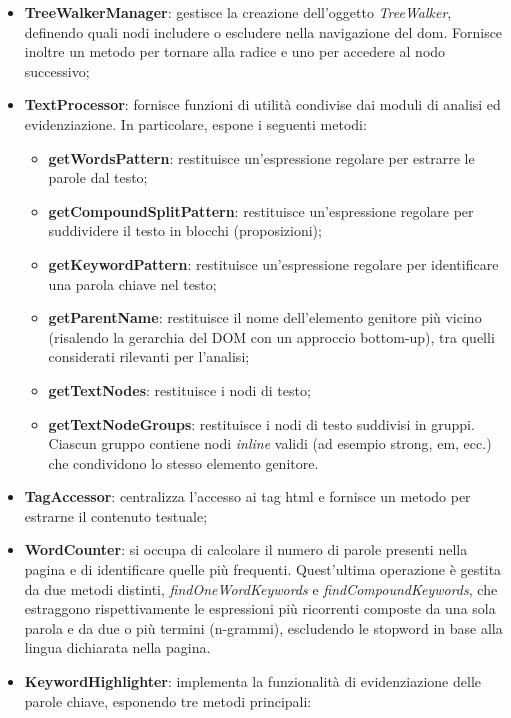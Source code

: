 \begin{itemize}
  \item \textbf{TreeWalkerManager}: gestisce la creazione dell’oggetto \textit{TreeWalker}, definendo quali nodi includere o escludere nella navigazione del \gls{dom}. Fornisce inoltre un metodo per tornare alla radice e uno per accedere al nodo successivo;
  \item \textbf{TextProcessor}: fornisce funzioni di utilità condivise dai moduli di analisi ed evidenziazione. In particolare, espone i seguenti metodi:
  \begin{itemize}
    \item \textbf{getWordsPattern}: restituisce un'espressione regolare per estrarre le parole dal testo;
    \item \textbf{getCompoundSplitPattern}: restituisce un’espressione regolare per suddividere il testo in blocchi (proposizioni);
    \item \textbf{getKeywordPattern}: restituisce un’espressione regolare per identificare una parola chiave nel testo;
    \item \textbf{getParentName}: restituisce il nome dell’elemento genitore più vicino (risalendo la gerarchia del DOM con un approccio bottom-up), tra quelli considerati rilevanti per l’analisi;
    \item \textbf{getTextNodes}: restituisce i nodi di testo;
    \item \textbf{getTextNodeGroups}: restituisce i nodi di testo suddivisi in gruppi. Ciascun gruppo contiene nodi \textit{inline} validi (ad esempio strong, em, ecc.) che condividono lo stesso elemento genitore.
  \end{itemize}
  \item \textbf{TagAccessor}: centralizza l’accesso ai tag \gls{html} e fornisce un metodo per estrarne il contenuto testuale;
  \item \textbf{WordCounter}: si occupa di calcolare il numero di parole presenti nella pagina e di identificare quelle più frequenti. Quest’ultima operazione è gestita da due metodi distinti, \textit{findOneWordKeywords} e \textit{findCompoundKeywords}, che estraggono rispettivamente le espressioni più ricorrenti composte da una sola parola e da due o più termini (n-grammi), escludendo le \gls{stopword} in base alla lingua dichiarata nella pagina.
  \item \textbf{KeywordHighlighter}: implementa la funzionalità di evidenziazione delle parole chiave, esponendo tre metodi principali:
  \begin{itemize}

\end{itemize}
\end{itemize}
